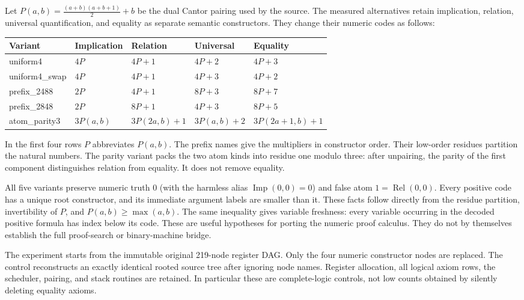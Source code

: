 \documentclass[11pt]{article}
\begin{document}
Let $P(a,b)=\frac{(a+b)(a+b+1)}2+b$ be the dual Cantor pairing used by the
source.  The measured alternatives retain implication, relation, universal
quantification, and equality as separate semantic constructors.  They
change their numeric codes as follows:
\begin{center}\small
\begin{tabular}{@{}lllll@{}}
\toprule
Variant&Implication&Relation&Universal&Equality\\
\midrule
uniform4&$4P$&$4P+1$&$4P+2$&$4P+3$\\
uniform4\_swap&$4P$&$4P+1$&$4P+3$&$4P+2$\\
prefix\_2488&$2P$&$4P+1$&$8P+3$&$8P+7$\\
prefix\_2848&$2P$&$8P+1$&$4P+3$&$8P+5$\\
atom\_parity3&$3P(a,b)$&$3P(2a,b)+1$&$3P(a,b)+2$&$3P(2a+1,b)+1$\\
\bottomrule
\end{tabular}
\end{center}
In the first four rows $P$ abbreviates $P(a,b)$.  The prefix names give the
multipliers in constructor order.  Their low-order residues partition the
natural numbers.  The parity variant packs the two atom kinds into residue
one modulo three: after unpairing, the parity of the first component
distinguishes relation from equality.  It does not remove equality.

All five variants preserve numeric truth $0$ (with the harmless alias
$\operatorname{Imp}(0,0)=0$) and false atom
$1=\operatorname{Rel}(0,0)$.  Every positive code has a unique root
constructor, and its immediate argument labels are smaller than it.  These
facts follow directly from the residue partition, invertibility of $P$, and
$P(a,b)\geq\max(a,b)$.  The same inequality gives variable freshness: every
variable occurring in the decoded positive formula has index below its code.
These are useful hypotheses for porting the numeric proof calculus.  They do
not by themselves establish the full proof-search or binary-machine bridge.

The experiment starts from the immutable original 219-node register DAG.
Only the four numeric constructor nodes are replaced.  The control reconstructs
an exactly identical rooted source tree after ignoring node names.  Register
allocation, all logical axiom rows, the scheduler, pairing, and stack routines
are retained.  In particular these are complete-logic controls, not low counts
obtained by silently deleting equality axioms.
\end{document}
